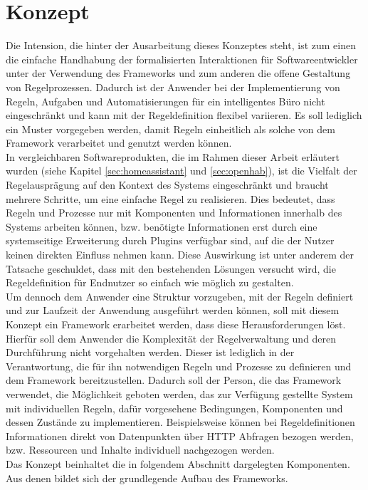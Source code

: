 \section{Konzept}
\label{sec:concept}
    Die Intension, die hinter der Ausarbeitung dieses Konzeptes steht, ist zum einen die einfache Handhabung der 
    formalisierten Interaktionen für Softwareentwickler %
    unter der Verwendung des Frameworks und zum anderen die 
    offene Gestaltung von Regelprozessen. Dadurch ist der Anwender bei der Implementierung von Regeln, Aufgaben und Automatisierungen 
    für ein intelligentes Büro nicht eingeschränkt und kann mit der Regeldefinition flexibel variieren.
    Es soll lediglich ein Muster vorgegeben werden, damit Regeln einheitlich als solche von dem Framework 
    verarbeitet und genutzt werden können. 
    \\ 
    \linebreak
    In vergleichbaren Softwareprodukten, die im Rahmen dieser Arbeit erläutert 
    wurden (siehe Kapitel \ref{sec:homeassistant} und \ref{sec:openhab}), ist die Vielfalt der Regelausprägung auf 
    den Kontext des Systems eingeschränkt und braucht mehrere Schritte, um eine einfache Regel zu realisieren. Dies bedeutet, dass 
    Regeln und Prozesse nur mit Komponenten und Informationen innerhalb des Systems arbeiten können, bzw. benötigte 
    Informationen erst durch eine systemseitige Erweiterung durch Plugins verfügbar sind, auf die der Nutzer keinen direkten 
    Einfluss nehmen kann. Diese Auswirkung ist unter anderem der 
    Tatsache geschuldet, dass mit den bestehenden Lösungen versucht wird, die Regeldefinition für Endnutzer so 
    einfach wie möglich zu gestalten. 
    \\
    \linebreak
    Um dennoch dem Anwender eine Struktur vorzugeben, mit der Regeln definiert und zur Laufzeit der Anwendung ausgeführt 
    werden können, soll mit diesem Konzept ein Framework erarbeitet werden, dass diese Herausforderungen löst. Hierfür soll 
    dem Anwender die Komplexität der Regelverwaltung und deren Durchführung nicht vorgehalten werden. Dieser ist lediglich 
    in der Verantwortung, die für ihn notwendigen Regeln und Prozesse zu definieren und dem Framework bereitzustellen. 
    Dadurch soll der Person, die das Framework verwendet, die Möglichkeit geboten werden, das zur Verfügung gestellte System 
    mit individuellen Regeln, dafür vorgesehene Bedingungen, Komponenten und dessen Zustände zu implementieren. Beispielsweise 
    können bei Regeldefinitionen Informationen direkt von Datenpunkten über \acs{HTTP} Abfragen bezogen werden, bzw. Ressourcen 
    und Inhalte individuell nachgezogen werden.
    \\ 
    Das Konzept beinhaltet die in folgendem Abschnitt dargelegten Komponenten. Aus denen bildet sich der grundlegende Aufbau 
    des Frameworks.

